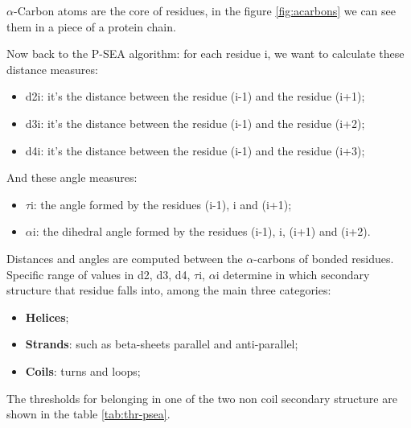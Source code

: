 $\alpha$-Carbon atoms are the core of residues, in the figure \ref{fig:acarbons} we can see them in a piece of a protein chain.

Now back to the P-SEA algorithm: for each residue i, we want to calculate these distance measures:
\begin{itemize}
    \item d2i: it's the distance between the residue (i-1) and the residue (i+1);
    \item d3i: it's the distance between the residue (i-1) and the residue (i+2);
    \item d4i: it's the distance between the residue (i-1) and the residue (i+3);
\end{itemize}

And these angle measures:
\begin{itemize}
    \item $\tau$i: the angle formed by the residues (i-1), i and (i+1);
    \item $\alpha$i: the dihedral angle formed by the residues (i-1), i, (i+1) and (i+2).
\end{itemize}

Distances and angles are computed between the $\alpha$-carbons of bonded residues.
Specific range of values in d2, d3, d4, $\tau$i, $\alpha$i determine in which secondary structure that residue falls into, among the main three categories:
\begin{itemize}
    \item \textbf{Helices};
    \item \textbf{Strands}: such as beta-sheets parallel and anti-parallel;
    \item \textbf{Coils}: turns and loops;
\end{itemize}

The thresholds for belonging in one of the two non coil secondary structure are shown in the table \ref{tab:thr-psea}.

